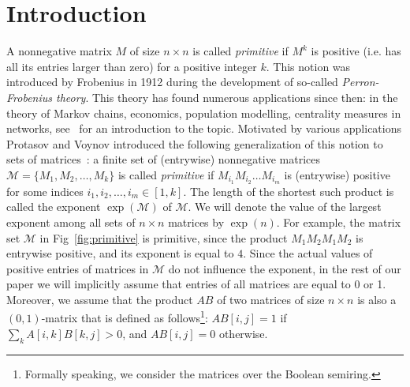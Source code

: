\documentclass[a4paper,USenglish]{lipics}
\theoremstyle{definition}
\begin{document}
\section{Introduction}
A nonnegative matrix $M$ of size $n\times n$ is called \emph{primitive} if $M^{k}$ is positive (i.e. has all its entries larger than zero) for a positive integer $k$. This notion was introduced by Frobenius in 1912 during the development of so-called \emph{Perron-Frobenius theory}. This theory has found numerous applications since then: in the theory of Markov chains, economics, population modelling, centrality measures in networks, see~\cite[Chapter 8]{Meyer2000} for an introduction to the topic.
Motivated by various applications Protasov and Voynov introduced the following generalization of this notion to sets of matrices~\cite{PrVo2012}: 
a finite set of (entrywise) nonnegative matrices $\mathcal{M}=\{M_1, M_2, \ldots, M_k\}$ is called \emph{primitive} if $M_{i_1} M_{i_2} \ldots M_{i_m}$ is (entrywise) positive for some indices $i_1, i_2, \ldots, i_m \in [1, k]$. The length of the shortest such product is called the exponent $\exp{(\mathcal{M})}$ of $\mathcal{M}$. We will denote the value of the largest exponent among all sets of $n \times n$ matrices by $\exp(n)$. For example, the matrix set $\mathcal{M}$ in Fig~\ref{fig:primitive} is primitive, since the product $M_1M_2M_1M_2$ is entrywise positive, and its exponent is equal to $4$. Since the actual values of positive entries of matrices in $\mathcal{M}$ do not influence the exponent, in the rest of our paper we will implicitly assume that entries of all matrices are equal to 0 or 1. Moreover, we assume that the product $AB$ of two matrices of size $n \times n$ is also a $(0,1)$-matrix that is defined as follows\footnote{Formally speaking, we consider the matrices over the Boolean semiring.}: $AB[i,j] = 1$ if $\sum_{k}A[i,k]B[k,j]>0$, and $AB[i,j]=0$ otherwise.
\end{document}
